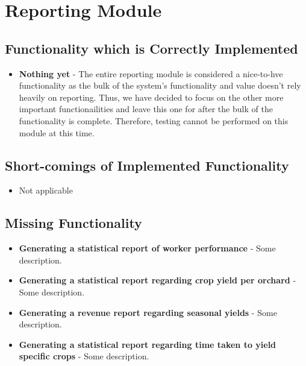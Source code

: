 \documentclass[11pt,fleqn]{book} %
\begin{document}


\chapter{Reporting Module}
	\section{Functionality which is Correctly Implemented}
		\begin{itemize}
			\item\textbf{Nothing yet} -
			The entire reporting module is considered a nice-to-hve functionality as the bulk of the system's functionality and value doesn't rely heavily on reporting. Thus, we have decided to focus on the other more important functionailities and leave this one for after the bulk of the functionality is complete. Therefore, testing cannot be performed on this module at this time.
		\end{itemize}
	\section{Short-comings of Implemented Functionality}
		\begin{itemize}
			\item{Not applicable}
		\end{itemize}
	\section{Missing Functionality}
		\begin{itemize}
			\item\textbf{Generating a statistical report of worker performance} -
			Some description.
			
			\item\textbf{Generating a statistical report regarding crop yield per orchard} -
			Some description.
			
			\item\textbf{Generating a revenue report regarding seasonal yields} -
			Some description.
			
			\item\textbf{Generating a statistical report regarding time taken to yield specific crops} -
			Some description.
		\end{itemize}
	
\end{document}
